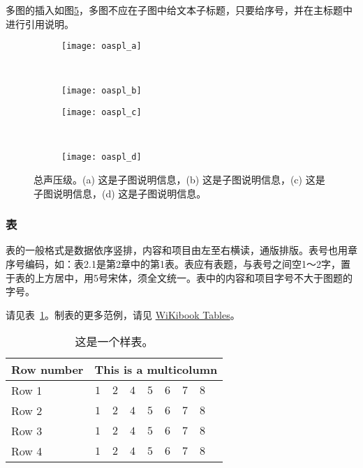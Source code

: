 多图的插入如图\ref{fig:oaspl}，多图不应在子图中给文本子标题，只要给序号，并在主标题中进行引用说明。
\begin{figure}[!htbp]
    \centering
    \begin{subfigure}[b]{0.35\textwidth}
      \texttt{[image: oaspl\_a]}
      \caption{}
      \label{fig:oaspl_a}
    \end{subfigure}%
    ~%
    \begin{subfigure}[b]{0.35\textwidth}
      \texttt{[image: oaspl\_b]}
      \caption{}
      \label{fig:oaspl_b}
    \end{subfigure}
    \begin{subfigure}[b]{0.35\textwidth}
      \texttt{[image: oaspl\_c]}
      \caption{}
      \label{fig:oaspl_c}
    \end{subfigure}%
    ~%
    \begin{subfigure}[b]{0.35\textwidth}
      \texttt{[image: oaspl\_d]}
      \caption{}
      \label{fig:oaspl_d}
    \end{subfigure}
    \caption{总声压级。(a) 这是子图说明信息，(b) 这是子图说明信息，(c) 这是子图说明信息，(d) 这是子图说明信息。}%
    \label{fig:oaspl}
\end{figure}

\subsubsection{表}
表的一般格式是数据依序竖排，内容和项目由左至右横读，通版排版。表号也用章序号编码，如：表2.1是第2章中的第1表。表应有表题，与表号之间空1～2字，置于表的上方居中，用5号宋体，须全文统一。表中的内容和项目字号不大于图题的字号。

请见表~\ref{tab:sample}。制表的更多范例，请见 \href{https://en.wikibooks.org/wiki/LaTeX/Tables}{WiKibook Tables}。
\begin{table}[!htbp]
    \caption{这是一个样表。}%
    \label{tab:sample}
    \centering
    \footnotesize%
    \setlength{\tabcolsep}{4pt}%
    \renewcommand{\arraystretch}{1.2}%
    \begin{tabular}{lcccccccc}
        \hline
        Row number & \multicolumn{8}{c}{This is a multicolumn} \\
        \hline
        Row 1 & $1$ & $2$ & $4$ & $5$ & $6$ & $7$ & $8$\\
        Row 2 & $1$ & $2$ & $4$ & $5$ & $6$ & $7$ & $8$\\
        Row 3 & $1$ & $2$ & $4$ & $5$ & $6$ & $7$ & $8$\\
        Row 4 & $1$ & $2$ & $4$ & $5$ & $6$ & $7$ & $8$\\
        \hline
    \end{tabular}
\end{table}


